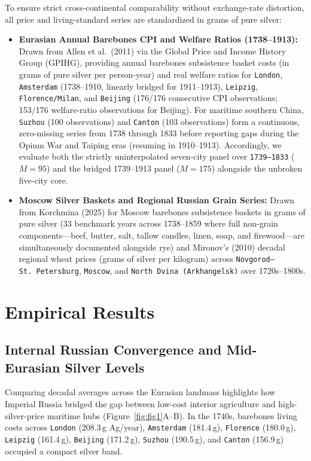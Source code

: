 \documentclass[11pt,a4paper]{article}
\begin{document}
To ensure strict cross-continental comparability without exchange-rate distortion, all price and living-standard series are standardized in grams of pure silver:
\begin{itemize}
    \item \textbf{Eurasian Annual Barebones CPI and Welfare Ratios (1738--1913):} Drawn from Allen et al.\ (2011) via the Global Price and Income History Group (GPIHG), providing annual barebones subsistence basket costs (in grams of pure silver per person-year) and real welfare ratios for \texttt{London}, \texttt{Amsterdam} (1738--1910, linearly bridged for 1911--1913), \texttt{Leipzig}, \texttt{Florence/Milan}, and \texttt{Beijing} (176/176 consecutive CPI observations; 153/176 welfare-ratio observations for Beijing). For maritime southern China, \texttt{Suzhou} (100 observations) and \texttt{Canton} (103 observations) form a continuous, zero-missing series from 1738 through 1833 before reporting gaps during the Opium War and Taiping eras (resuming in 1910--1913). Accordingly, we evaluate both the strictly uninterpolated seven-city panel over \texttt{1739--1833} ($M = 95$) and the bridged 1739--1913 panel ($M = 175$) alongside the unbroken five-city core.
    \item \textbf{Moscow Silver Baskets and Regional Russian Grain Series:} Drawn from Korchmina (2025) for Moscow barebones subsistence baskets in grams of pure silver (33 benchmark years across 1738--1859 where full non-grain components—beef, butter, salt, tallow candles, linen, soap, and firewood—are simultaneously documented alongside rye) and Mironov's (2010) decadal regional wheat prices (grams of silver per kilogram) across \texttt{Novgorod--St.~Petersburg}, \texttt{Moscow}, and \texttt{North Dvina (Arkhangelsk)} over 1720s--1800s.
\end{itemize}

\section{Empirical Results}

\subsection{Internal Russian Convergence and Mid-Eurasian Silver Levels}
Comparing decadal averages across the Eurasian landmass highlights how Imperial Russia bridged the gap between low-cost interior agriculture and high-silver-price maritime hubs (Figure~\ref{fig:fig1}A--B). In the 1740s, barebones living costs across \texttt{London} (208.3\,g Ag/year), \texttt{Amsterdam} (181.4\,g), \texttt{Florence} (180.0\,g), \texttt{Leipzig} (161.4\,g), \texttt{Beijing} (171.2\,g), \texttt{Suzhou} (190.5\,g), and \texttt{Canton} (156.9\,g) occupied a compact silver band.
\end{document}
